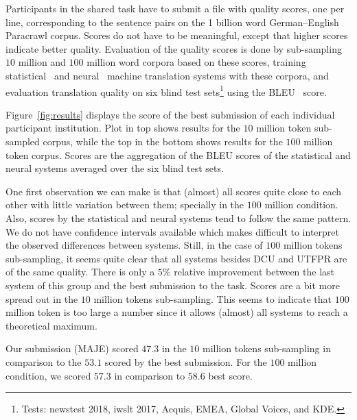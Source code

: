 Participants in the shared task have to submit a file with quality scores, one per line, corresponding to the sentence pairs on the 1 billion word German–English Paracrawl corpus. Scores do not have to be meaningful, except that higher scores indicate better quality. Evaluation of the quality scores is done by sub-sampling $10$ million and $100$ million word corpora based on these scores, training statistical~\cite{Moses} and neural~\cite{Marian} machine translation systems with these corpora, and evaluation translation quality on six blind test sets\footnote{Tests: newstest 2018, iwslt 2017, Acquis, EMEA, Global Voices, and KDE.} using the BLEU~\cite{Bleu} score. 

Figure~\ref{fig:results} displays the score of the best submission of each individual participant institution. Plot in top shows results for the $10$ million token sub-sampled corpus, while the top in the bottom shows results for the $100$ million token corpus. Scores are the aggregation of the BLEU scores of the statistical and neural systems averaged over the six blind test sets.

One first observation we can make is that (almost) all scores quite close to each other with little variation between them; specially in the $100$ million condition. Also, scores by the statistical and neural systems tend to follow the same pattern. We do not have confidence intervals available which makes difficult to interpret the observed differences between systems. Still, in the case of $100$ million tokens sub-sampling, it seems quite clear that all systems besides DCU and UTFPR are of the same quality. There is only a $5\%$ relative improvement between the last system of this group and the best submission to the task. Scores are a bit more spread out in the $10$ million tokens sub-sampling. This seems to indicate that $100$ million token is too large a number since it allows (almost) all systems to reach a theoretical maximum.

Our submission (MAJE) scored $47.3$ in the $10$ million tokens sub-sampling in comparison to the $53.1$ scored by the best submission. For the $100$ million condition, we scored $57.3$ in comparison to $58.6$ best score.